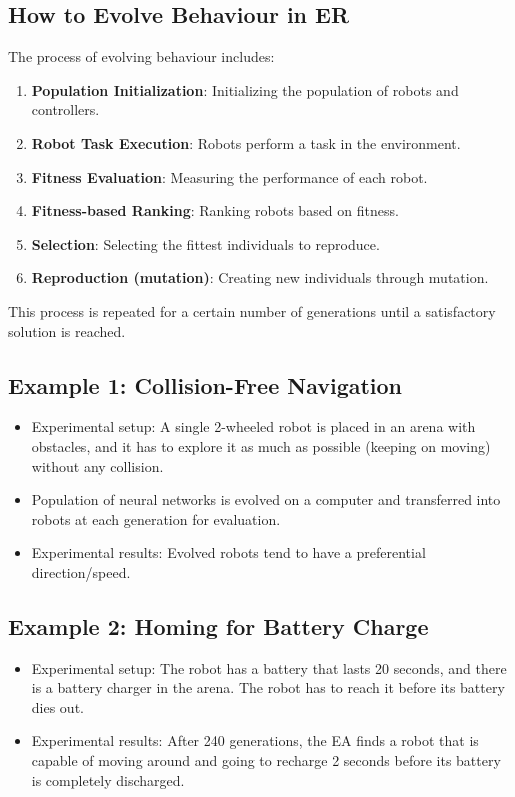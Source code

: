 \subsection*{How to Evolve Behaviour in ER}
The process of evolving behaviour includes:
\begin{enumerate}
    \item \textbf{Population Initialization}: Initializing the population of robots and controllers.
    \item \textbf{Robot Task Execution}: Robots perform a task in the environment.
    \item \textbf{Fitness Evaluation}: Measuring the performance of each robot.
    \item \textbf{Fitness-based Ranking}: Ranking robots based on fitness.
    \item \textbf{Selection}: Selecting the fittest individuals to reproduce.
    \item \textbf{Reproduction (mutation)}: Creating new individuals through mutation.
\end{enumerate}
This process is repeated for a certain number of generations until a satisfactory solution is reached.

\subsection*{Example 1: Collision-Free Navigation}
\begin{itemize}
    \item  Experimental setup: A single 2-wheeled robot is placed in an arena with obstacles, and it has to explore it as much as possible (keeping on moving) without any collision.
    \item Population of neural networks is evolved on a computer and transferred into robots at each generation for evaluation.
    \item Experimental results: Evolved robots tend to have a preferential direction/speed.
\end{itemize}

\subsection*{Example 2: Homing for Battery Charge}
\begin{itemize}
   \item Experimental setup: The robot has a battery that lasts 20 seconds, and there is a battery charger in the arena. The robot has to reach it before its battery dies out.
   \item Experimental results: After 240 generations, the EA finds a robot that is capable of moving around and going to recharge 2 seconds before its battery is completely discharged.
\end{itemize}

